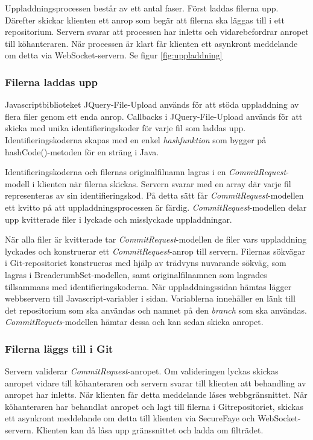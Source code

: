 Uppladdningsprocessen består av ett antal faser. Först laddas filerna upp. Därefter skickar klienten ett anrop som begär att filerna ska läggas till i ett repositorium. Servern svarar att processen har inletts och vidarebefordrar anropet till köhanteraren. När processen är klart får klienten ett asynkront meddelande om detta via WebSocket-servern. Se figur \ref{fig:uppladdning}

\subsubsection{Filerna laddas upp}

Javascriptbiblioteket JQuery-File-Upload används för att stöda uppladdning av flera filer genom ett enda anrop. 
Callbacks i JQuery-File-Upload används för att skicka med unika identifieringskoder för varje fil som laddas upp. Identifieringskoderna skapas med en enkel \emph{hashfunktion} som bygger på hashCode()-metoden för en sträng i Java.

Identifieringskoderna och filernas originalfilnamn lagras i en \emph{CommitRequest}-modell i klienten när filerna skickas. Servern svarar med en array där varje fil representeras av sin identifieringskod. På detta sätt får \emph{CommitRequest}-modellen ett kvitto på att uppladdningsprocessen är färdig. \emph{CommitRequest}-modellen delar upp kvitterade filer i lyckade och misslyckade uppladdningar. 

När alla filer är kvitterade tar \emph{CommitRequest}-modellen de filer vars uppladdning lyckades och konstruerar ett \emph{CommitRequest}-anrop till servern. Filernas sökvägar i Git-repositoriet konstrueras med hjälp av trädvyns nuvarande sökväg, som lagras i BreadcrumbSet-modellen, samt originalfilnamnen som lagrades tillsammans med identifieringskoderna.
När uppladdningssidan hämtas lägger webbservern till Javascript-variabler i sidan. Variablerna innehåller en länk till det  repositorium som ska användas och namnet på den \emph{branch} som ska användas. \emph{CommitRequets}-modellen hämtar dessa och kan sedan skicka anropet.

\subsubsection{Filerna läggs till i Git}

Servern validerar \emph{CommitRequest}-anropet. Om valideringen lyckas skickas anropet vidare till köhanteraren och servern svarar till klienten att behandling av anropet har inletts. När klienten får detta meddelande låses webbgränsnittet.
När köhanteraren har behandlat anropet och lagt till filerna i Gitrepositoriet, skickas ett asynkront meddelande om detta till klienten via SecureFaye och WebSocket-servern. Klienten kan då låsa upp gränssnittet och ladda om filträdet.

